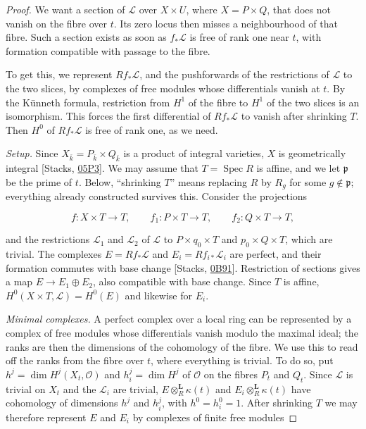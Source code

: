 \documentclass[11pt]{article}
\begin{document}
\begin{proof}[{Proof}]\label{bp89}%
We want a section of \(\mathcal L\) over \(X\times U\), where \(X=P\times Q\), that does not vanish on the fibre over \(t\). Its zero locus then misses a neighbourhood of that fibre. Such a section exists as soon as \(f_*\mathcal L\) is free of rank one near \(t\), with formation compatible with passage to the fibre.

To get this, we represent \(Rf_*\mathcal L\), and the pushforwards of the restrictions of \(\mathcal L\) to the two slices, by complexes of free modules whose differentials vanish at \(t\). By the Künneth formula, restriction from \(H^1\) of the fibre to \(H^1\) of the two slices is an isomorphism. This forces the first differential of \(Rf_*\mathcal L\) to vanish after shrinking \(T\). Then \(H^0\) of \(Rf_*\mathcal L\) is free of rank one, as we need.

\emph{Setup.} Since \(X_{\bar k}=P_{\bar k}\times Q_{\bar k}\) is a product of integral varieties, \(X\) is geometrically integral [Stacks, \href{https://stacks.math.columbia.edu/tag/05P3}{05P3}]. We may assume that \(T=\operatorname{Spec}R\) is affine, and we let \(\mathfrak p\) be the prime of \(t\). Below, “shrinking \(T\)” means replacing \(R\) by \(R_g\) for some \(g\notin\mathfrak p\); everything already constructed survives this. Consider the projections

\[
f:X\times T\to T,\qquad f_1:P\times T\to T,\qquad f_2:Q\times T\to T,
\]

and the restrictions \(\mathcal L_1\) and \(\mathcal L_2\) of \(\mathcal L\) to \(P\times q_0\times T\) and \(p_0\times Q\times T\), which are trivial. The complexes \(E=Rf_*\mathcal L\) and \(E_i=Rf_{i*}\mathcal L_i\) are perfect, and their formation commutes with base change [Stacks, \href{https://stacks.math.columbia.edu/tag/0B91}{0B91}]. Restriction of sections gives a map \(E\to E_1\oplus E_2\), also compatible with base change. Since \(T\) is affine, \(H^0(X\times T,\mathcal L)=H^0(E)\) and likewise for \(E_i\).

\emph{Minimal complexes.} A perfect complex over a local ring can be represented by a complex of free modules whose differentials vanish modulo the maximal ideal; the ranks are then the dimensions of the cohomology of the fibre. We use this to read off the ranks from the fibre over \(t\), where everything is trivial. To do so, put \(h^j=\dim H^j(X_t,\mathcal O)\) and \(h_i^j=\dim H^j\) of \(\mathcal O\) on the fibres \(P_t\) and \(Q_t\). Since \(\mathcal L\) is trivial on \(X_t\) and the \(\mathcal L_i\) are trivial, \(E\otimes^{\mathbf L}_R\kappa(t)\) and \(E_i\otimes^{\mathbf L}_R\kappa(t)\) have cohomology of dimensions \(h^j\) and \(h_i^j\), with \(h^0=h_i^0=1\). After shrinking \(T\) we may therefore represent \(E\) and \(E_i\) by complexes of finite free modules


\end{proof}
\end{document}
